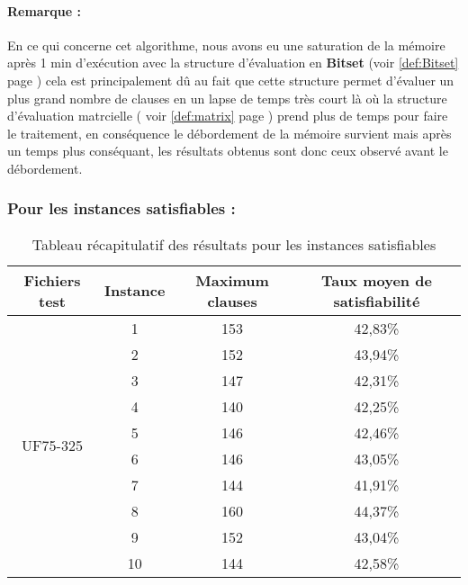 \paragraph{Remarque :} \label{BreadthIssueExperience} En ce qui concerne cet algorithme, nous avons eu une saturation de la mémoire après 1 min d'exécution avec la structure d'évaluation en \textbf{Bitset} (voir \ref*{def:Bitset} page \pageref{def:Bitset}) cela est principalement dû au fait que cette structure permet d'évaluer un plus grand nombre de clauses en un lapse de temps  très court là où la structure d'évaluation matrcielle ( voir \ref{def:matrix} page \pageref{def:matrix}) prend plus de temps pour faire le traitement, en conséquence le débordement de la mémoire survient mais après un temps plus conséquant, les résultats obtenus sont donc ceux observé avant le débordement.
\subsubsection{Pour les instances satisfiables :}
\begin{table}[H]
	\centering
	\label{table:Tab_BFS_Sat}
	\begin{tabular}{|c|c|c|c|}
		\hline
		Fichiers test              & Instance & Maximum clauses & Taux  moyen de satisfiabilité \\ \hline
		\multirow{10}{*}{UF75-325} & 1        & 153             & 42,83\%                       \\ \cline{2-4} 
		& 2        & 152             & 43,94\%                       \\ \cline{2-4} 
		& 3        & 147             & 42,31\%                       \\ \cline{2-4} 
		& 4        & 140             & 42,25\%                       \\ \cline{2-4} 
		& 5        & 146             & 42,46\%                       \\ \cline{2-4} 
		& 6        & 146             & 43,05\%                       \\ \cline{2-4} 
		& 7        & 144             & 41,91\%                       \\ \cline{2-4} 
		& 8        & 160             & 44,37\%                       \\ \cline{2-4} 
		& 9        & 152             & 43,04\%                       \\ \cline{2-4} 
		& 10       & 144             & 42,58\%                       \\ \hline
	\end{tabular}
	\caption{Tableau récapitulatif des résultats pour les instances satisfiables}
\end{table}
